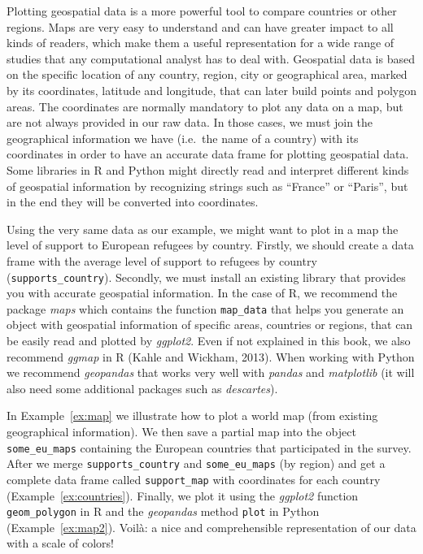Plotting geospatial data is a more powerful tool to compare countries or other regions.  Maps are very easy to understand and can have greater impact to all kinds of readers, which make them a useful representation for a wide range of studies that any computational analyst has to deal with. Geospatial data is based on the specific location of any country, region, city or geographical area, marked by its coordinates, latitude and longitude, that can later build points and polygon areas. The coordinates are normally mandatory to plot any data on a map, but are not always provided in our raw data. In those cases, we must join the geographical information we have (i.e.\ the name of a country) with its coordinates in order to have an accurate data frame for plotting geospatial data. Some libraries in R and Python might directly read and interpret different kinds of geospatial information by recognizing strings such as ``France'' or ``Paris'', but in the end they will be converted into coordinates.

Using the very same data 
as our example, we might want to plot in a map the level of support to European refugees by country. Firstly, we should create a data frame with the average level of support to refugees by country (\texttt{supports\_country}). Secondly, we must install an existing library that provides you with accurate geospatial information. In the case of R, we recommend the package \emph{maps} which contains the function \texttt{map\_data} that helps you generate an object with geospatial information of specific areas, countries or regions, that can be easily read and plotted by \emph{ggplot2}. Even if not explained in this book, we also recommend \emph{ggmap} in R (Kahle and Wickham, 2013). When working with Python we recommend \emph{geopandas} that works very well with \emph{pandas} and \emph{matplotlib} (it will also need some additional packages such as \emph{descartes}).

In Example~\ref{ex:map} we illustrate how to plot a world map (from existing geographical information).
We then save a partial map into the object \texttt{some\_eu\_maps} containing the European countries that participated in the survey. After we merge \texttt{supports\_country} and \texttt{some\_eu\_maps} (by region) and get a complete data frame called \texttt{support\_map} with coordinates for each country (Example~\ref{ex:countries}).
Finally, we plot it using the \emph{ggplot2} function \texttt{geom\_polygon} in R and the \emph{geopandas} method \texttt{plot} in Python (Example~\ref{ex:map2}). Voil\`a: a nice and comprehensible representation of our data with a scale of colors!

